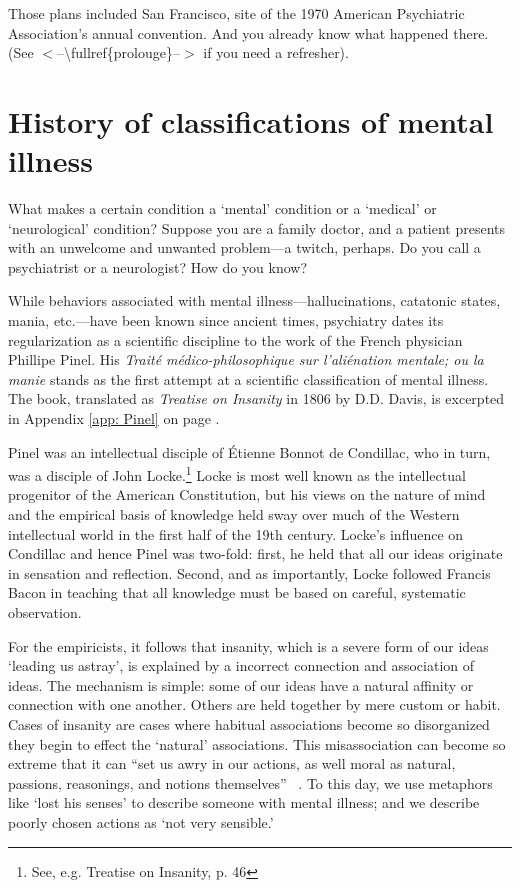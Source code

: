 \begin{refsection}
Those plans included San Francisco, site of the 1970 American Psychiatric Association's annual convention. And you already know what happened there. (See $<$--\textbackslash{}fullref\{prolouge\}--$>$ if you need a refresher).

\section{History of classifications of mental illness}
\label{historyofclassificationsofmentalillness}

What makes a certain condition a `mental' condition or a `medical' or `neurological' condition? Suppose you are a family doctor, and a patient presents with an unwelcome and unwanted problem---a twitch, perhaps. Do you call a psychiatrist or a neurologist? How do you know?

While behaviors associated with mental illness---hallucinations, catatonic states, mania, etc.---have been known since ancient times, psychiatry dates its regularization as a scientific discipline to the work of the French physician Phillipe Pinel. His \emph{Traité médico-philosophique sur l'aliénation mentale; ou la manie} stands as the first attempt at a scientific classification of mental illness. The book, translated as \emph{Treatise on Insanity} in 1806 by D.D. Davis, is excerpted in Appendix \ref{app: Pinel} on page \pageref{app: Pinel}. 

Pinel was an intellectual disciple of Étienne Bonnot de Condillac, who in turn, was a disciple of John Locke.\footnote{See, e.g. Treatise on Insanity, p. 46} Locke is most well known as the intellectual progenitor of the American Constitution, but his views on the nature of mind and the empirical basis of knowledge held sway over much of the Western intellectual world in the first half of the 19th century. Locke's influence on Condillac and hence Pinel was two-fold: first, he held that all our ideas originate in sensation and reflection. Second, and as importantly, Locke followed Francis Bacon in teaching that all knowledge must be based on careful, systematic observation.

For the empiricists, it follows that insanity, which is a severe form of our ideas `leading us astray', is explained by a incorrect connection and association of ideas. The mechanism is simple: some of our ideas have a natural affinity or connection with one another. Others are held together by mere custom or habit. Cases of insanity are cases where habitual associations become so disorganized they begin to effect the `natural' associations. This misassociation can become so extreme that it can ``set us awry in our actions, as well moral as natural, passions, reasonings, and notions themselves'' ~\citep[Bk 2, Ch 33, p9. Pg. 531]{Locke:1959wj}. To this day, we use metaphors like `lost his senses' to describe someone with mental illness; and we describe poorly chosen actions as `not very sensible.'


\end{refsection}
